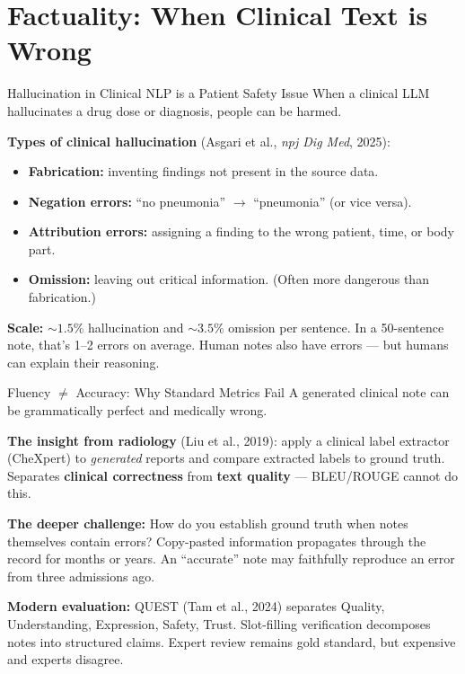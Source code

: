 \documentclass[aspectratio=169,11pt]{beamer}
\begin{document}
\section{Factuality: When Clinical Text is Wrong}

\begin{frame}{Hallucination in Clinical NLP is a Patient Safety Issue}
When a clinical LLM hallucinates a drug dose or diagnosis, people can be harmed.

\vspace{0.3em}
\textbf{Types of clinical hallucination} (Asgari et al., \textit{npj Dig Med}, 2025):
\begin{itemize}\setlength\itemsep{0em}
  \item \textbf{Fabrication:} inventing findings not present in the source data.
  \item \textbf{Negation errors:} ``no pneumonia'' $\rightarrow$ ``pneumonia'' (or vice versa).
  \item \textbf{Attribution errors:} assigning a finding to the wrong patient, time, or body part.
  \item \textbf{Omission:} leaving out critical information. (Often more dangerous than fabrication.)
\end{itemize}

\vspace{0.3em}
\textbf{Scale:} ${\sim}1.5\%$ hallucination and ${\sim}3.5\%$ omission per sentence. In a 50-sentence note, that's 1--2 errors on average.
Human notes also have errors --- but humans can explain their reasoning.
\end{frame}

\begin{frame}{Fluency $\neq$ Accuracy: Why Standard Metrics Fail}
\small
A generated clinical note can be grammatically perfect and medically wrong.

\vspace{0.2em}
\textbf{The insight from radiology} (Liu et al., 2019): apply a clinical label extractor (CheXpert) to \emph{generated} reports and compare extracted labels to ground truth. Separates \textbf{clinical correctness} from \textbf{text quality} --- BLEU/ROUGE cannot do this.

\vspace{0.2em}
\textbf{The deeper challenge:} How do you establish ground truth when notes themselves contain errors? Copy-pasted information propagates through the record for months or years. An ``accurate'' note may faithfully reproduce an error from three admissions ago.

\vspace{0.2em}
\textbf{Modern evaluation:}
QUEST (Tam et al., 2024) separates Quality, Understanding, Expression, Safety, Trust.
Slot-filling verification decomposes notes into structured claims.
Expert review remains gold standard, but expensive and experts disagree.
\end{frame}
\end{document}
